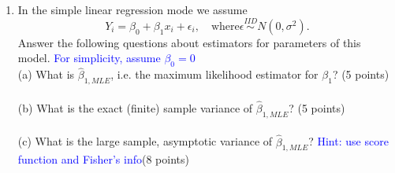\documentclass[12pt]{article}
\begin{document}
\begin{enumerate}[leftmargin=\labelsep]
(a) What is the likelihood for $\nu_1$? (5 points)\\
\vspace{3in}\\
(b) Let $W = \frac{U/\nu_1}{V/\nu_2}$. What is the likelihood for $(\nu_1, \nu_2)$ given  $W = w_{obs}$? (5 points) \textcolor{blue}{Hint: give form of pdf for $Z=X/Y$ from Ch 3, answer should be written in terms of $w_{obs}$}\\
\pagebreak 

\item In the simple linear regression mode we assume $$Y_i = \beta_0 + \beta_1 x_i + \epsilon_i, \quad \text{where} \epsilon \stackrel{IID}{\sim} N(0, \sigma^2).$$
Answer the following questions about estimators for parameters of this model. \textcolor{blue}{For simplicity, assume $\beta_0 = 0$}\\

(a) What is $\hat{\beta}_{1, MLE}$, i.e. the maximum likelihood estimator for $\beta_1$? (5 points)\\
\vspace{3in}\\
(b) What is the exact (finite) sample variance of $\hat{\beta}_{1, MLE}$? (5 points)\\
\vspace{3in}\\
(c) What is the large sample, asymptotic variance of $\hat{\beta}_{1, MLE}$? \textcolor{blue}{Hint: use score function and Fisher's info}(8 points)\\

\end{enumerate}
\end{document}
